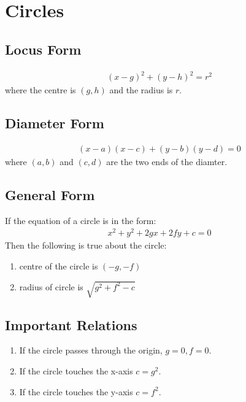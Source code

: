 \documentclass[../main.tex]{subfile}
\begin{document}
    \chapter{Circles}
        \section{Locus Form}
        \begin{align}
            (x-g)^2+(y-h)^2=r^2
        \end{align}
        where the centre is $(g,h)$ and the radius is $r$.

        \section{Diameter Form}
        \begin{align}
            (x-a)(x-c)+(y-b)(y-d)=0
        \end{align}
        where $(a,b)$ and $(c,d)$ are the two ends of the diamter.

        \section{General Form}
        If the equation of a circle is in the form:
        \begin{align}
            x^2+y^2+2gx+2fy+c=0
        \end{align}
        Then the following is true about the circle:
        \begin{enumerate}
        \item centre of the circle is $(-g,-f)$
        \item radius of circle is $\sqrt{g^2+f^2-c}$
        \end{enumerate}

        \section{Important Relations}
        \begin{enumerate}
        \item If the circle passes through the origin, $g=0,f=0$.
        \item If the circle touches the x-axis $c=g^2$.
        \item If the circle touches the y-axis $c=f^2$.
        \end{enumerate}
\end{document}
